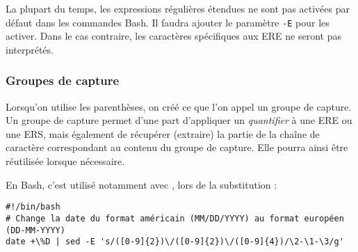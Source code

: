 La plupart du temps, les expressions régulières étendues ne sont pas activées par défaut dans les commandes Bash. Il faudra ajouter le paramètre \texttt{-E} pour les activer. Dans le cas contraire, les caractères spécifiques aux ERE ne seront pas interprétés.


\subsubsection{Groupes de capture}

Lorsqu'on utilise les parenthèses, on créé ce que l'on appel un groupe de capture. Un groupe de capture permet d'une part d'appliquer un \textit{quantifier} à une ERE ou une ERS, mais également de récupérer (extraire) la partie de la chaîne de caractère correspondant au contenu du groupe de capture. Elle pourra ainsi être réutilisée lorsque nécessaire.

En Bash, c'est utilisé notamment avec , lors de la substitution :

\begin{code}
    \begin{verbatim}
#!/bin/bash
# Change la date du format américain (MM/DD/YYYY) au format européen (DD-MM-YYYY)
date +\%D | sed -E 's/([0-9]{2})\/([0-9]{2})\/([0-9]{4})/\2-\1-\3/g'
    \end{verbatim}
    \vspace{-0.5cm}
    \label{code:regex_groups}
\end{code}

\newpage


